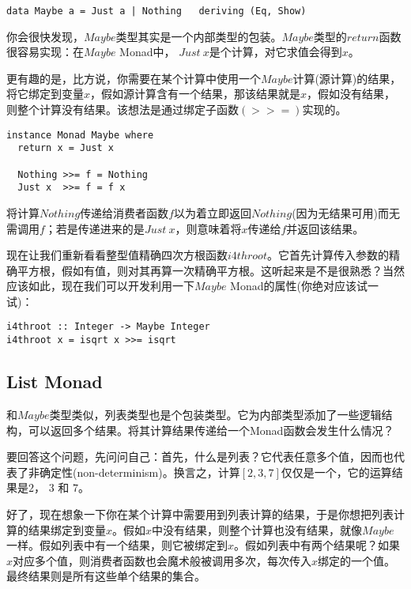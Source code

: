\begin{lstlisting}
data Maybe a = Just a | Nothing   deriving (Eq, Show)
\end{lstlisting}

你会很快发现，$Maybe$类型其实是一个内部类型的包装。$Maybe$类型的$return$函数很容易实现：在$Maybe$ Monad中， $Just\ x$是个计算，对它求值会得到$x$。

更有趣的是，比方说，你需要在某个计算中使用一个$Maybe$计算(源计算)的结果，将它绑定到变量$x$，假如源计算含有一个结果，那该结果就是$x$，假如没有结果，则整个计算没有结果。该想法是通过绑定子函数$(>>=)$实现的。

\begin{lstlisting}
instance Monad Maybe where
  return x = Just x

  Nothing >>= f = Nothing
  Just x  >>= f = f x
\end{lstlisting}

将计算$Nothing$传递给消费者函数$f$以为着立即返回$Nothing$(因为无结果可用)而无需调用$f$；若是传递进来的是$Just\ x$，则意味着将$x$传递给$f$并返回该结果。

现在让我们重新看看整型值精确四次方根函数$i4throot$。它首先计算传入参数的精确平方根，假如有值，则对其再算一次精确平方根。这听起来是不是很熟悉？当然应该如此，现在我们可以开发利用一下$Maybe$ Monad的属性(你绝对应该试一试)：

\begin{lstlisting}
i4throot :: Integer -> Maybe Integer
i4throot x = isqrt x >>= isqrt
\end{lstlisting}

\subsection{List Monad}

和$Maybe$类型类似，列表类型也是个包装类型。它为内部类型添加了一些逻辑结构，可以返回多个结果。将其计算结果传递给一个Monad函数会发生什么情况？

要回答这个问题，先问问自己：首先，什么是列表？它代表任意多个值，因而也代表了非确定性(non-determinism)。换言之，计算$[2,3,7]$仅仅是一个，它的运算结果是$2$， $3$ 和 $7$。

好了，现在想象一下你在某个计算中需要用到列表计算的结果，于是你想把列表计算的结果绑定到变量$x$。假如$x$中没有结果，则整个计算也没有结果，就像$Maybe$一样。假如列表中有一个结果，则它被绑定到$x$。假如列表中有两个结果呢？如果$x$对应多个值，则消费者函数也会魔术般被调用多次，每次传入$x$绑定的一个值。最终结果则是所有这些单个结果的集合。

